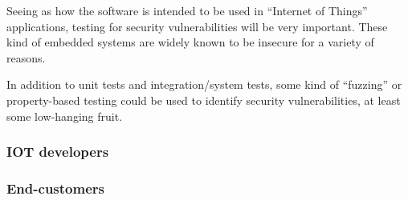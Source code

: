 Seeing as how the software is intended to be used in ``Internet of Things''
applications, testing for security vulnerabilities will be very important.
These kind of embedded systems are widely known to be insecure for a variety of
reasons. \cite{iot-malwarebytes}

In addition to unit tests and integration/system tests, some kind of
``fuzzing'' or property-based testing \cite{hypothesis-testing} could be used
to identify security vulnerabilities, at least some low-hanging fruit.



\subsubsection{IOT developers}


\subsubsection{End-customers}
